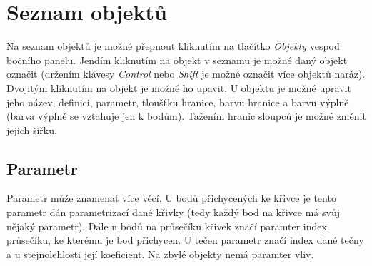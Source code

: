 \documentclass[11pt]{article}
\begin{document}
    \section{Seznam objektů}
    Na seznam objektů je možné přepnout kliknutím na tlačítko \textit{Objekty} vespod bočního panelu. Jendím kliknutím na objekt v seznamu je možné daný objekt označit (držením klávesy \textit{Control} nebo \textit{Shift} je možné označit více objektů naráz). Dvojitým kliknutím na objekt je možné ho upavit. U objektu je možné upravit jeho název, definici, parametr, tloušťku hranice, barvu hranice a barvu výplně (barva výplně se vztahuje jen k bodům). Tažením hranic sloupců je možné změnit jejich šířku.
    \subsection{Parametr}
    Parametr může znamenat více věcí. U bodů přichycených ke křivce je tento parametr dán parametrizací dané křivky (tedy každý bod na křivce má svůj nějaký parametr). Dále u bodů na průsečíku křivek značí paramter index průsečíku, ke kterému je bod přichycen. U tečen parametr značí index dané tečny a u stejnolehlosti její koeficient. Na zbylé objekty nemá paramter vliv.
\end{document}
